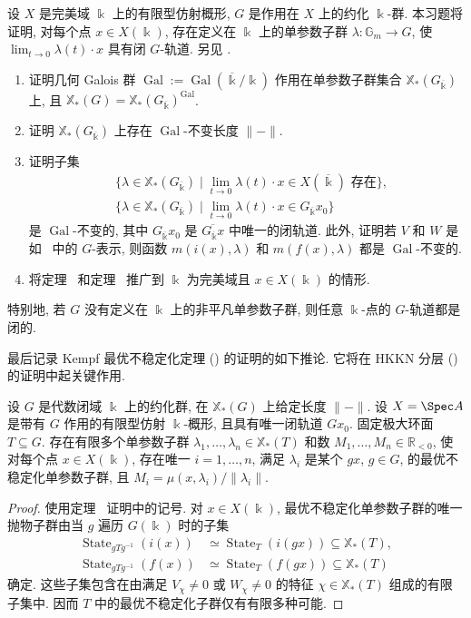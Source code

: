 \begin{exercise}[完美域上不稳定化单参数子群的存在性]\label{src:8.6.15}
设 $X$ 是完美域 $\Bbbk$ 上的有限型仿射概形, $G$ 是作用在 $X$ 上的约化 $\Bbbk$-群. 本习题将证明, 对每个点 $x\in X(\Bbbk)$, 存在定义在 $\Bbbk$ 上的单参数子群 $\lambda:\mathbb G_m\to G$, 使 $\lim_{t\to0}\lambda(t)\cdot x$ 具有闭 $G$-轨道. 另见 \cite[\S4]{Kem78}.
\begin{enumerate}[(1)]
\item 证明几何 Galois 群 $\operatorname{Gal}:=\operatorname{Gal}(\overline{\Bbbk}/\Bbbk)$ 作用在单参数子群集合 $\mathbb X_*(G_{\overline{\Bbbk}})$ 上, 且 $\mathbb X_*(G)=\mathbb X_*(G_{\overline{\Bbbk}})^{\operatorname{Gal}}$.
\item 证明 $\mathbb X_*(G_{\overline{\Bbbk}})$ 上存在 $\operatorname{Gal}$-不变长度 $\|{-}\|$.
\item 证明子集
\[
\begin{aligned}
&\{\lambda\in\mathbb X_*(G_{\overline{\Bbbk}})\mid\lim_{t\to0}\lambda(t)\cdot x\in X(\overline{\Bbbk})\text{ 存在}\},\\
&\{\lambda\in\mathbb X_*(G_{\overline{\Bbbk}})\mid\lim_{t\to0}\lambda(t)\cdot x\in G_{\overline{\Bbbk}}x_0\}
\end{aligned}
\]
是 $\operatorname{Gal}$-不变的, 其中 $G_{\overline{\Bbbk}}x_0$ 是 $\overline{G_{\overline{\Bbbk}}x}$ 中唯一的闭轨道. 此外, 证明若 $V$ 和 $W$ 是如~ 中的 $G$-表示, 则函数 $m(i(x),\lambda)$ 和 $m(f(x),\lambda)$ 都是 $\operatorname{Gal}$-不变的.
\item 将定理~ 和定理~ 推广到 $\Bbbk$ 为完美域且 $x\in X(\Bbbk)$ 的情形.
\end{enumerate}
特别地, 若 $G$ 没有定义在 $\Bbbk$ 上的非平凡单参数子群, 则任意 $\Bbbk$-点的 $G$-轨道都是闭的.
\end{exercise}
最后记录 Kempf 最优不稳定化定理 () 的证明的如下推论. 它将在 HKKN 分层 () 的证明中起关键作用.
\begin{proposition}\label{src:8.6.16}
设 $G$ 是代数闭域 $\Bbbk$ 上的约化群, 在 $\mathbb X_*(G)$ 上给定长度 $\|{-}\|$. 设 $X=\Spec A$ 是带有 $G$ 作用的有限型仿射 $\Bbbk$-概形, 且具有唯一闭轨道 $Gx_0$. 固定极大环面 $T\subseteq G$. 存在有限多个单参数子群 $\lambda_1,\ldots,\lambda_n\in\mathbb X_*(T)$ 和数 $M_1,\ldots,M_n\in\mathbb R_{<0}$, 使对每个点 $x\in X(\Bbbk)$, 存在唯一 $i=1,\ldots,n$, 满足 $\lambda_i$ 是某个 $gx$, $g\in G$, 的最优不稳定化单参数子群, 且 $M_i=\mu(x,\lambda_i)/\|\lambda_i\|$.
\end{proposition}
\begin{proof}
使用定理~ 证明中的记号. 对 $x\in X(\Bbbk)$, 最优不稳定化单参数子群的唯一抛物子群由当 $g$ 遍历 $G(\Bbbk)$ 时的子集
\begin{align*}
\operatorname{State}_{gTg^{-1}}(i(x))&\simeq\operatorname{State}_T(i(gx))\subseteq\mathbb X_*(T),\\
\operatorname{State}_{gTg^{-1}}(f(x))&\simeq\operatorname{State}_T(f(gx))\subseteq\mathbb X_*(T)
\end{align*}
确定. 这些子集包含在由满足 $V_\chi\ne0$ 或 $W_\chi\ne0$ 的特征 $\chi\in\mathbb X_*(T)$ 组成的有限子集中. 因而 $T$ 中的最优不稳定化子群仅有有限多种可能.
\end{proof}
